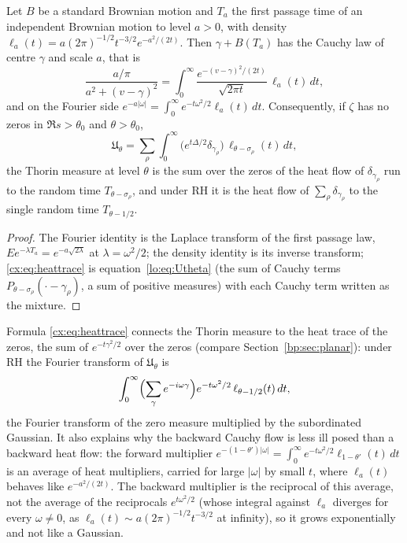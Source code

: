 \begin{proposition}[subordination]\label{cx:prop:subord}
Let $B$ be a standard Brownian motion and $T_a$ the first passage time of an independent Brownian motion to level $a>0$, with density $\ell_a(t)=a(2\pi)^{-1/2}t^{-3/2}e^{-a^2/(2t)}$. Then $\gamma+B(T_a)$ has the Cauchy law of centre $\gamma$ and scale $a$, that is
\begin{equation}\label{cx:eq:mixture}
\frac{a/\pi}{a^2+(v-\gamma)^2}=\int_0^\infty\frac{e^{-(v-\gamma)^2/(2t)}}{\sqrt{2\pi t}}\,\ell_a(t)\,dt,
\end{equation}
and on the Fourier side $e^{-a|\omega|}=\int_0^\infty e^{-t\omega^2/2}\ell_a(t)\,dt$. Consequently, if $\zeta$ has no zeros in $\Re s>\theta_0$ and $\theta>\theta_0$,
\begin{equation}\label{cx:eq:heattrace}
\mathfrak U_\theta=\sum_\rho\int_0^\infty\bigl(e^{t\Delta/2}\delta_{\gamma_\rho}\bigr)\,\ell_{\theta-\sigma_\rho}(t)\,dt,
\end{equation}
the Thorin measure at level $\theta$ is the sum over the zeros of the heat flow of $\delta_{\gamma_\rho}$ run to the random time $T_{\theta-\sigma_\rho}$, and under RH it is the heat flow of $\sum_\rho\delta_{\gamma_\rho}$ to the single random time $T_{\theta-1/2}$.
\end{proposition}

\begin{proof}
The Fourier identity is the Laplace transform of the first passage law, $Ee^{-\lambda T_a}=e^{-a\sqrt{2\lambda}}$ at $\lambda=\omega^2/2$; the density identity is its inverse transform; \eqref{cx:eq:heattrace} is equation~\eqref{lo:eq:Utheta} (the sum of Cauchy terms $P_{\theta-\sigma_\rho}(\cdot-\gamma_\rho)$, a sum of positive measures) with each Cauchy term written as the mixture.
\end{proof}

Formula \eqref{cx:eq:heattrace} connects the Thorin measure to the heat trace of the zeros, the sum of $e^{-t\gamma^2/2}$ over the zeros (compare Section~\ref{bp:sec:planar}): under RH the Fourier transform of $\mathfrak U_\theta$ is
\[
\int_0^\infty\Bigl(\sum_\gamma e^{-i\omega\gamma}\Bigr)e^{-t\omega^2/2}\,\ell_{\theta-1/2}(t)\,dt,
\]
the Fourier transform of the zero measure multiplied by the subordinated Gaussian. It also explains why the backward Cauchy flow is less ill posed than a backward heat flow: the forward multiplier $e^{-(1-\theta')|\omega|}=\int_0^\infty e^{-t\omega^2/2}\ell_{1-\theta'}(t)\,dt$ is an average of heat multipliers, carried for large $|\omega|$ by small $t$, where $\ell_a(t)$ behaves like $e^{-a^2/(2t)}$. The backward multiplier is the reciprocal of this average, not the average of the reciprocals $e^{t\omega^2/2}$ (whose integral against $\ell_a$ diverges for every $\omega\ne0$, as $\ell_a(t)\sim a(2\pi)^{-1/2}t^{-3/2}$ at infinity), so it grows exponentially and not like a Gaussian.

